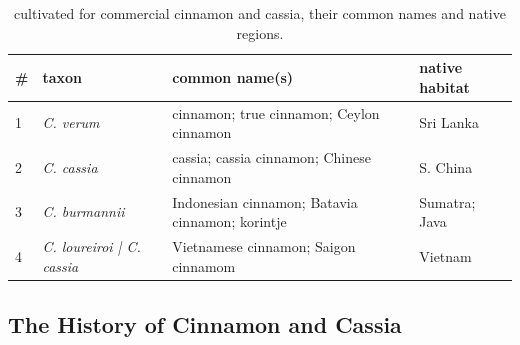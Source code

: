 \begin{table}[!ht]
\centering
\begin{tabularx}{\linewidth}{@{}llXl@{}}
\toprule
\textbf{\#} & \textbf{taxon} & \textbf{common name(s)} & \textbf{native habitat} \\ \midrule
1           & \textit{C. verum}     & cinnamon; true cinnamon; Ceylon cinnamon & Sri Lanka \\
2           & \textit{C. cassia}    & cassia; cassia cinnamon; Chinese cinnamon & S. China \\
3           & \textit{C. burmannii}  & Indonesian cinnamon; Batavia cinnamon; korintje  & Sumatra; Java \\
4           & \textit{C. loureiroi | C. cassia} & Vietnamese cinnamon; Saigon cinnamom & Vietnam \\ \bottomrule
\end{tabularx}
\caption{ cultivated for commercial cinnamon and cassia, their common names and native regions.}
\label{table:cinnamomum_spp}
\end{table}





\subsection{The History of Cinnamon and Cassia}

